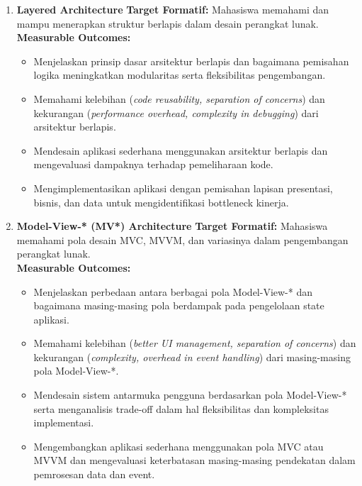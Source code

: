 \begin{enumerate}
\item \textbf{Layered Architecture}  
\textbf{Target Formatif:} Mahasiswa memahami dan mampu menerapkan struktur berlapis dalam desain perangkat lunak.  \\
\textbf{Measurable Outcomes:}
\begin{itemize}
\item Menjelaskan prinsip dasar arsitektur berlapis dan bagaimana pemisahan logika meningkatkan modularitas serta fleksibilitas pengembangan.
\item Memahami kelebihan (\textit{code reusability, separation of concerns}) dan kekurangan (\textit{performance overhead, complexity in debugging}) dari arsitektur berlapis.
\item Mendesain aplikasi sederhana menggunakan arsitektur berlapis dan mengevaluasi dampaknya terhadap pemeliharaan kode.
\item Mengimplementasikan aplikasi dengan pemisahan lapisan presentasi, bisnis, dan data untuk mengidentifikasi bottleneck kinerja.
\end{itemize}

\item \textbf{Model-View-* (MV*) Architecture}  
\textbf{Target Formatif:} Mahasiswa memahami pola desain MVC, MVVM, dan variasinya dalam pengembangan perangkat lunak.  \\
\textbf{Measurable Outcomes:}
\begin{itemize}
\item Menjelaskan perbedaan antara berbagai pola Model-View-* dan bagaimana masing-masing pola berdampak pada pengelolaan state aplikasi.
\item Memahami kelebihan (\textit{better UI management, separation of concerns}) dan kekurangan (\textit{complexity, overhead in event handling}) dari masing-masing pola Model-View-*.
\item Mendesain sistem antarmuka pengguna berdasarkan pola Model-View-* serta menganalisis trade-off dalam hal fleksibilitas dan kompleksitas implementasi.
\item Mengembangkan aplikasi sederhana menggunakan pola MVC atau MVVM dan mengevaluasi keterbatasan masing-masing pendekatan dalam pemrosesan data dan event.
\end{itemize}


\end{enumerate}
